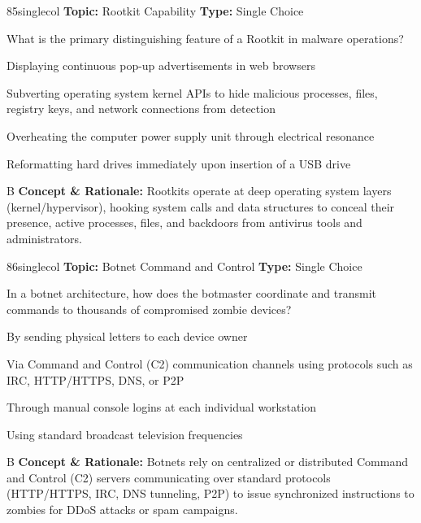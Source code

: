\begin{qcard}{85}{singlecol}
\textcolor{darkslate!75}{\small\textbf{Topic:} Rootkit Capability \hfill \textbf{Type:} Single Choice}\vspace{0.4em}\par
What is the primary distinguishing feature of a Rootkit in malware operations?
\begin{qoptions}
\item Displaying continuous pop-up advertisements in web browsers
\item Subverting operating system kernel APIs to hide malicious processes, files, registry keys, and network connections from detection
\item Overheating the computer power supply unit through electrical resonance
\item Reformatting hard drives immediately upon insertion of a USB drive
\end{qoptions}
\end{qcard}
\nopagebreak
\begin{explainbox}{B}
\textbf{Concept \& Rationale:} Rootkits operate at deep operating system layers (kernel/hypervisor), hooking system calls and data structures to conceal their presence, active processes, files, and backdoors from antivirus tools and administrators.
\end{explainbox}

\begin{qcard}{86}{singlecol}
\textcolor{darkslate!75}{\small\textbf{Topic:} Botnet Command and Control \hfill \textbf{Type:} Single Choice}\vspace{0.4em}\par
In a botnet architecture, how does the botmaster coordinate and transmit commands to thousands of compromised zombie devices?
\begin{qoptions}
\item By sending physical letters to each device owner
\item Via Command and Control (C2) communication channels using protocols such as IRC, HTTP/HTTPS, DNS, or P2P
\item Through manual console logins at each individual workstation
\item Using standard broadcast television frequencies
\end{qoptions}
\end{qcard}
\nopagebreak
\begin{explainbox}{B}
\textbf{Concept \& Rationale:} Botnets rely on centralized or distributed Command and Control (C2) servers communicating over standard protocols (HTTP/HTTPS, IRC, DNS tunneling, P2P) to issue synchronized instructions to zombies for DDoS attacks or spam campaigns.
\end{explainbox}

